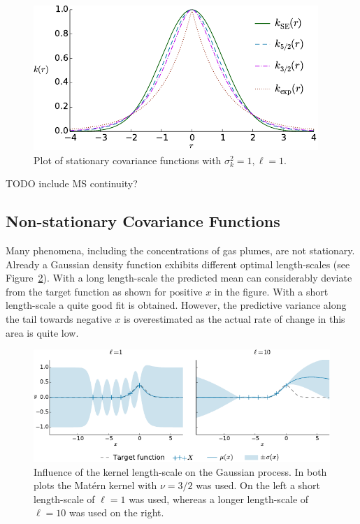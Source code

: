 \documentclass[11pt,a4paper,twoside,BCOR=15mm]{scrreprt}
\begin{document}
\begin{figure}
    \centering
    \includegraphics{plots/kernels}
    \caption[Covariance functions]{Plot of stationary covariance functions with 
        $\sigma_k^2 = 1, \ell = 1$.}\label{fig:kernels}
\end{figure}

TODO include MS continuity?

\subsection{Non-stationary Covariance Functions}
Many phenomena, including the concentrations of gas plumes, are not stationary.  
Already a Gaussian density function exhibits different optimal length-scales 
(see Figure~\ref{fig:gp-lengthscale}).  With a long length-scale the predicted 
mean can considerably deviate from the target function as shown for positive $x$ 
in the figure. With a short length-scale a quite good fit is obtained. However, 
the predictive variance along the tail towards negative $x$ is overestimated as 
the actual rate of change in this area is quite low.

\begin{figure}
    \centering
    \includegraphics{plots/gp-lengthscale}
    \caption[Length-scale influence]{Influence of the kernel length-scale on the 
        Gaussian process. In both plots the Mat\'ern kernel with $\nu = 3/2$ was 
        used. On the left a short length-scale of $\ell = 1$ was used, whereas 
        a longer length-scale of $\ell = 10$ was used on the right.
    }\label{fig:gp-lengthscale}
\end{figure}
\end{document}
